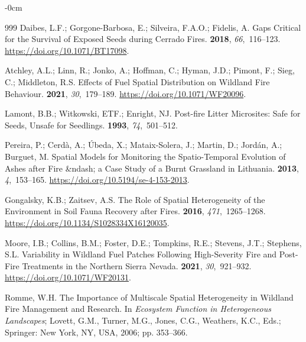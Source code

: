 \documentclass[fire,article,accept,oneauthor,pdftex]{Definitions/mdpi}
\begin{document}
\begin{adjustwidth}{-\extralength}{0cm}
\begin{thebibliography}{999}
Daibes, L.F.; {Gorgone-Barbosa}, E.; Silveira, F.A.O.; Fidelis, A.
\newblock Gaps Critical for the Survival of Exposed Seeds during {{Cerrado}}
  Fires.
 {\bf 2018}, {\em 66},~116--123.
\newblock
  \url{https://doi.org/10.1071/BT17098}.

Atchley, A.L.; Linn, R.; Jonko, A.; Hoffman, C.; Hyman, J.D.; Pimont, F.; Sieg,
  C.; Middleton, R.S.
\newblock Effects of Fuel Spatial Distribution on Wildland Fire Behaviour.
 {\bf 2021}, {\em
  30},~179--189.
\newblock
  \url{https://doi.org/10.1071/WF20096}.

Lamont, B.B.; Witkowski, {\relax ETF}.; Enright, {\relax NJ}.
\newblock Post-fire Litter Microsites: Safe for Seeds, Unsafe for Seedlings.
 {\bf 1993}, {\em 74},~501--512.

Pereira, P.; Cerd{\`a}, A.; {\'U}beda, X.; {Mataix-Solera}, J.; Martin, D.;
  Jord{\'a}n, A.; Burguet, M.
\newblock Spatial Models for Monitoring the Spatio-Temporal Evolution of Ashes
  after Fire \&ndash; a Case Study of a Burnt Grassland in {{Lithuania}}.
 {\bf 2013}, {\em 4},~153--165.
\newblock
  \url{https://doi.org/10.5194/se-4-153-2013}.

Gongalsky, K.B.; Zaitsev, A.S.
\newblock The Role of Spatial Heterogeneity of the Environment in Soil Fauna
  Recovery after Fires.
 {\bf 2016}, {\em 471},~1265--1268.
\newblock
  \url{https://doi.org/10.1134/S1028334X16120035}.

Moore, I.B.; Collins, B.M.; Foster, D.E.; Tompkins, R.E.; Stevens, J.T.;
  Stephens, S.L.
\newblock Variability in Wildland Fuel Patches Following High-Severity Fire and
  Post-Fire Treatments in the Northern {{Sierra Nevada}}.
 {\bf 2021}, {\em
  30},~921--932.
\newblock
  \url{https://doi.org/10.1071/WF20131}.

Romme, W.H.
\newblock The Importance of Multiscale Spatial Heterogeneity in Wildland Fire
  Management and Research. In {\em Ecosystem Function in Heterogeneous
  Landscapes}; Lovett, G.M., Turner, M.G., Jones, C.G., Weathers, K.C., Eds.;
  Springer: New York, NY, USA, 2006; pp. 353--366.


\end{thebibliography}
\end{adjustwidth}
\end{document}
